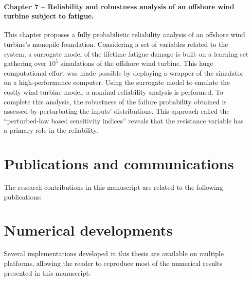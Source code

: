 \paragraph{Chapter 7 -- Reliability and robustness analysis of an offshore wind turbine subject to fatigue.} 
This chapter proposes a fully probabilistic reliability analysis of an offshore wind turbine's monopile foundation. 
Considering a set of variables related to the system, a surrogate model of the lifetime fatigue damage is built on a learning set gathering over $10^5$ simulations of the offshore wind turbine.  
This huge computational effort was made possible by deploying a wrapper of the simulator on a high-performance computer.   
Using the surrogate model to emulate the costly wind turbine model, a nominal reliability analysis is performed. 
To complete this analysis, the robustness of the failure probability obtained is assessed by perturbating the inputs' distributions. 
This approach called the ``perturbed-law based sensitivity indices'' \citep{lemaitre_2015_PLI} reveals that the resistance variable has a primary role in the reliability. 


\clearpage

\section*{Publications and communications}

The research contributions in this manuscript are related to the following publications: 



\section*{Numerical developments}

Several implementations developed in this thesis are available on multiple platforms, allowing the reader to reproduce most of the numerical results presented in this manuscript:  

